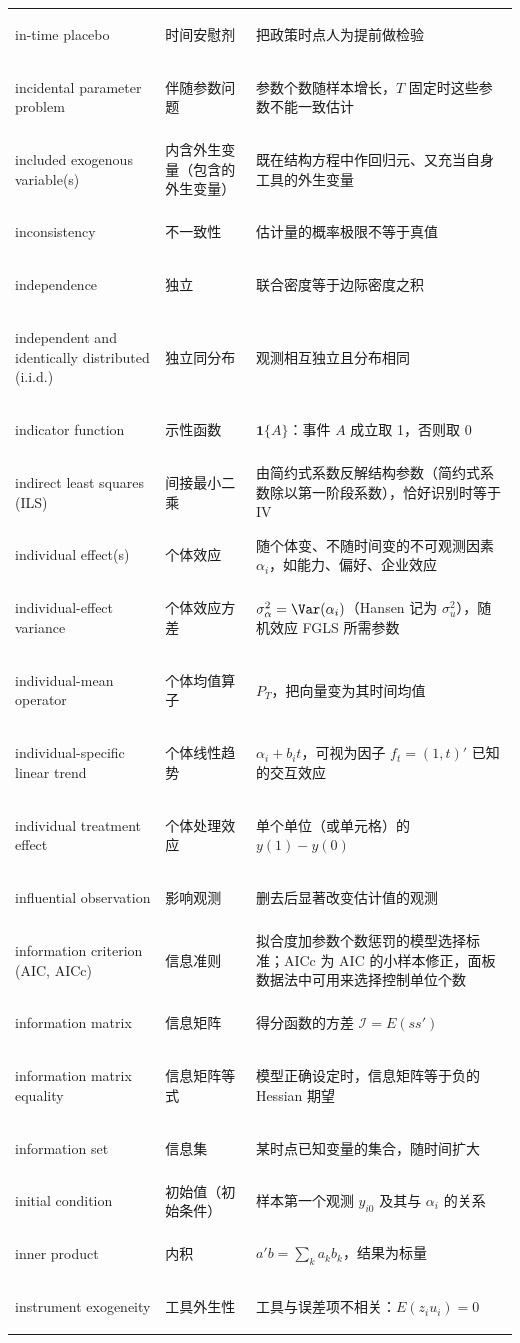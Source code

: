 \begin{longtable}{@{}>{\bfseries\boldmath\raggedright\arraybackslash}p{4.6cm}>{\raggedright\arraybackslash}p{3.2cm}>{\raggedright\arraybackslash}p{\dimexpr\textwidth-7.8cm-4\tabcolsep\relax}@{}}
in-time placebo & 时间安慰剂 & 把政策时点人为提前做检验 \\
incidental parameter problem & 伴随参数问题 & 参数个数随样本增长，$T$ 固定时这些参数不能一致估计 \\
included exogenous variable(s) & 内含外生变量（包含的外生变量） & 既在结构方程中作回归元、又充当自身工具的外生变量 \\
inconsistency & 不一致性 & 估计量的概率极限不等于真值 \\
independence & 独立 & 联合密度等于边际密度之积 \\
independent and identically distributed (i.i.d.) & 独立同分布 & 观测相互独立且分布相同 \\
indicator function & 示性函数 & $\mathbf{1}\{A\}$：事件 $A$ 成立取 1，否则取 0 \\
indirect least squares (ILS) & 间接最小二乘 & 由简约式系数反解结构参数（简约式系数除以第一阶段系数），恰好识别时等于 IV \\
individual effect(s) & 个体效应 & 随个体变、不随时间变的不可观测因素 $\alpha_i$，如能力、偏好、企业效应 \\
individual-effect variance & 个体效应方差 & $\sigma_\alpha^2=\Var(\alpha_i)$（Hansen 记为 $\sigma_u^2$），随机效应 FGLS 所需参数 \\
individual-mean operator & 个体均值算子 & $P_T$，把向量变为其时间均值 \\
individual-specific linear trend & 个体线性趋势 & $\alpha_i+b_it$，可视为因子 $f_t=(1,t)'$ 已知的交互效应 \\
individual treatment effect & 个体处理效应 & 单个单位（或单元格）的 $y(1)-y(0)$ \\
influential observation & 影响观测 & 删去后显著改变估计值的观测 \\
information criterion (AIC, AICc) & 信息准则 & 拟合度加参数个数惩罚的模型选择标准；AICc 为 AIC 的小样本修正，面板数据法中可用来选择控制单位个数 \\
information matrix & 信息矩阵 & 得分函数的方差 $\mathcal{I}=E(ss')$ \\
information matrix equality & 信息矩阵等式 & 模型正确设定时，信息矩阵等于负的 Hessian 期望 \\
information set & 信息集 & 某时点已知变量的集合，随时间扩大 \\
initial condition & 初始值（初始条件） & 样本第一个观测 $y_{i0}$ 及其与 $\alpha_i$ 的关系 \\
inner product & 内积 & $a'b=\sum_ka_kb_k$，结果为标量 \\
instrument exogeneity & 工具外生性 & 工具与误差项不相关：$E(z_iu_i)=0$ \\

\end{longtable}
